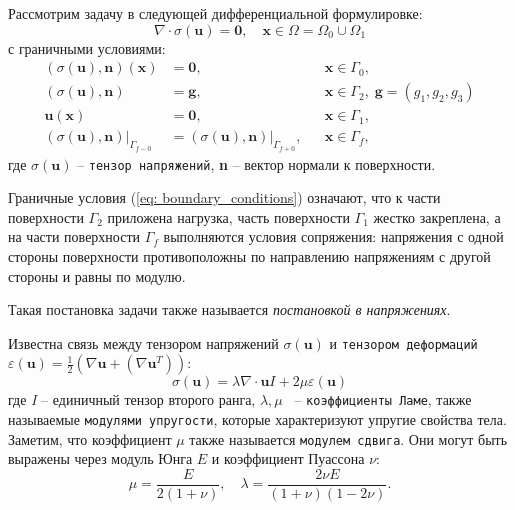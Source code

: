 \documentclass[a4paper, 14pt]{extreport}
\begin{document}
Рассмотрим задачу в следующей дифференциальной формулировке:
\begin{equation}
	\label{eq:1}
	\nabla\!\cdot\!\sigma(\textbf{u}) = \textbf{0}, \quad \textbf{x} \in \Omega = \Omega_0 \cup \Omega_1
\end{equation}
с граничными условиями:
\begin{equation}
	\label{eq: boundary_conditions}
	\begin{aligned}
		(\sigma(\textbf{u}), \textbf{n})(\textbf{x}) 	  	  &= \textbf{0},   &&\textbf{x} \in \Gamma_0,\\
		(\sigma(\textbf{u}), \textbf{n}) 				  	  &= \textbf{g},   &&\textbf{x} \in \Gamma_2, \; \textbf{g} = (g_1, g_2, g_3)\\
		\textbf{u}(\textbf{x})							  	  &= \textbf{0},	   &&\textbf{x} \in \Gamma_1,\\
		(\sigma(\textbf{u}), \textbf{n})\vert_{\Gamma_{f - 0}} &= 
			(\sigma(\textbf{u}), \textbf{n})\vert_{\Gamma_{f + 0}},             &&\textbf{x} \in \Gamma_f,
	\end{aligned}
\end{equation}
где $\sigma(\textbf{u})$  -- \texttt{тензор напряжений}, \textbf{n} -- вектор нормали
к поверхности. 

Граничные условия (\ref{eq: boundary_conditions}) означают, что к части поверхности 
$\Gamma_2$ приложена нагрузка, часть поверхности $\Gamma_1$ жестко закреплена, 
а на части поверхности $\Gamma_f$ выполняются условия сопряжения: напряжения 
с одной стороны поверхности противоположны по направлению напряжениям с 
другой стороны и равны по модулю.

Такая постановка задачи также называется \textit{постановкой в напряжениях}.

Известна связь между тензором напряжений $\sigma(\textbf{u})$ и \texttt{тензором деформаций}
$\varepsilon(\textbf{u}) = \frac{1}{2}(\nabla\textbf{u} + (\nabla\textbf{u}^T))$:
\begin{equation*}
\sigma(\textbf{u}) = \lambda \nabla\!\cdot\!\textbf{u}\textit{I} + 2\mu\varepsilon(\textbf{u})
\end{equation*}
где \textit{I} -- единичный тензор второго ранга,
$\lambda, \mu $ \, -- \texttt{коэффициенты Ламе}, также называемые 
\texttt{модулями упругости}, которые характеризуют упругие свойства тела. Заметим, что коэффициент $\mu$ также называется \texttt{модулем сдвига}. Они могут быть выраже­ны через модуль Юнга $E$ и коэффициент Пуассона $\nu$:
\begin{equation}
	\label{eq: young_puasson}
\mu = \frac{E}{2(1 + \nu)}, \quad \lambda = \frac{2\nu E}{(1 + \nu)(1 - 2\nu)}.
\end{equation}
\end{document}

